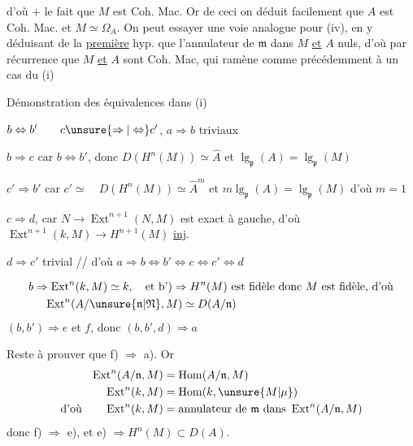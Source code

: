 d'où   $+$ le fait que $M$ est Coh. Mac. Or de ceci on déduit facilement que $A$ est Coh. Mac. et $M\simeq\Omega_A$. On peut essayer une voie analogue pour (iv), en y déduisant de la \uline{première} hyp.  que l'annulateur de $\mathfrak m$ dans $M$ \uline{et} $A$  nuls, d'où par récurrence que $M$ \uline{et} $A$ sont Coh. Mac,  qui ramène comme précédemment à un cas du (i)

Démonstration des équivalences dans (i)

$b\Leftrightarrow b'\qquad c\unsure{\Rightarrow|\Leftrightarrow}c'$, \qquad $a\Rightarrow b$ \deleted{\unsure{$\Rightarrow$}} triviaux

$b\Rightarrow c$ car $b\Leftrightarrow b'$, donc $D(H^n(M))\simeq\widehat A$ et $\lg_{\mathfrak p}(A)=\lg_{\mathfrak p}(M)$

$c'\Rightarrow b'$ car $c'\simeq\quad D(H^n(M))\simeq\widehat A^{m}$ et $m\lg_{\mathfrak p}(A)=\lg_{\mathfrak p}(M)$ d'où $m=1$


$c\Rightarrow d$, car $N\to\operatorname{Ext}^{n+1}(N,M)$ est exact à gauche, d'où $\operatorname{Ext}^{n+1}(k,M)\to H^{n+1}(M)$ \uline{inj}.

$d\Rightarrow c'$ trivial  // d'où $a\Rightarrow b\Leftrightarrow b'\Leftrightarrow c\Leftrightarrow c'\Leftrightarrow d$

\[
\begin{aligned}
b&\Rightarrow\operatorname{Ext}^n(k,M)\simeq k,\quad
  \text{et b')}\Rightarrow H^n(M)\text{ est fidèle donc }M\text{ est fidèle, d'où}\\
 &\phantom{\Rightarrow}\operatorname{Ext}^n(A/\unsure{\mathfrak n|\mathfrak N},M)\simeq D(A/\mathfrak n)
\end{aligned}
\]
$(b,b')\Rightarrow e$ et $f$, donc $(b,b',d)\Rightarrow a$

Reste à prouver que f) $\Rightarrow$ a).  Or
\[
\begin{aligned}
\operatorname{Ext}^n(A/\mathfrak n,M)&=\operatorname{Hom}(A/\mathfrak n,M)\\
\operatorname{Ext}^n(k,M)&=\operatorname{Hom}(k,\unsure{M|\mu})\\
\text{d'où}\qquad \operatorname{Ext}^n(k,M)&=\text{annulateur de }\mathfrak m\text{ dans }\operatorname{Ext}^n(A/\mathfrak n,M)
\end{aligned}
\]
donc f) $\Rightarrow$ e), et e) $\Rightarrow H^{n}(M)\subset D(A)$.

